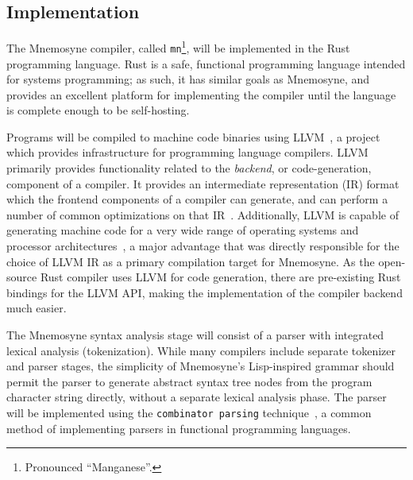 \documentclass[11pt,a4paper]{article}
\theoremstyle{break}
\begin{document}
\subsection{Implementation}

The Mnemosyne compiler, called \texttt{mn}\footnote{Pronounced ``Manganese''.}, will be implemented in the Rust programming language. Rust is a safe, functional programming language intended for systems programming; as such, it has similar goals as Mnemosyne, and provides an excellent platform for implementing the compiler until the language is complete enough to be self-hosting.

Programs will be compiled to machine code binaries using LLVM~\cite{Lattner:2004:LCF:977395.977673}, a project which provides infrastructure for programming language compilers. LLVM primarily provides functionality related to the \textit{backend}, or code-generation, component of a compiler. It provides an intermediate representation (IR) format which the frontend components of a compiler can generate, and can perform a number of common optimizations on that IR~\cite{Lattner:2004:LCF:977395.977673,Terei:2010:LBG:1863523.1863538}. Additionally, LLVM is capable of generating machine code for a very wide range of operating systems and processor architectures~\cite{Lattner:2004:LCF:977395.977673,Terei:2010:LBG:1863523.1863538}, a major advantage that was directly responsible for the choice of LLVM IR as a primary compilation target for Mnemosyne. As the open-source Rust compiler uses LLVM for code generation, there are pre-existing Rust bindings for the LLVM API, making the implementation of the compiler backend much easier.

The Mnemosyne syntax analysis stage will consist of a parser with integrated lexical analysis (tokenization). While many compilers include separate tokenizer and parser stages, the simplicity of Mnemosyne's Lisp-inspired grammar should permit the parser to generate abstract syntax tree nodes from the program character string directly, without a separate lexical analysis phase. The parser will be implemented using the \texttt{combinator parsing} technique~\cite{swierstra2001combinator,frost2008parser,fokker1995functional,hutton1996monadic}, a common method of implementing parsers in functional programming languages.
\end{document}
